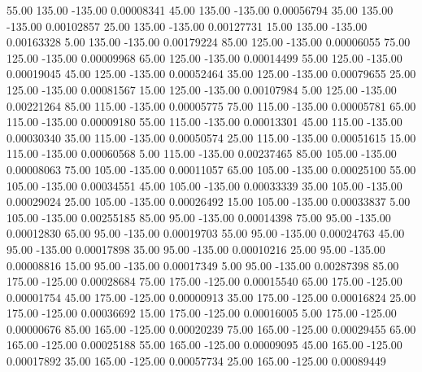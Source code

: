      55.00    135.00   -135.00     0.00008341
     45.00    135.00   -135.00     0.00056794
     35.00    135.00   -135.00     0.00102857
     25.00    135.00   -135.00     0.00127731
     15.00    135.00   -135.00     0.00163328
      5.00    135.00   -135.00     0.00179224
     85.00    125.00   -135.00     0.00006055
     75.00    125.00   -135.00     0.00009968
     65.00    125.00   -135.00     0.00014499
     55.00    125.00   -135.00     0.00019045
     45.00    125.00   -135.00     0.00052464
     35.00    125.00   -135.00     0.00079655
     25.00    125.00   -135.00     0.00081567
     15.00    125.00   -135.00     0.00107984
      5.00    125.00   -135.00     0.00221264
     85.00    115.00   -135.00     0.00005775
     75.00    115.00   -135.00     0.00005781
     65.00    115.00   -135.00     0.00009180
     55.00    115.00   -135.00     0.00013301
     45.00    115.00   -135.00     0.00030340
     35.00    115.00   -135.00     0.00050574
     25.00    115.00   -135.00     0.00051615
     15.00    115.00   -135.00     0.00060568
      5.00    115.00   -135.00     0.00237465
     85.00    105.00   -135.00     0.00008063
     75.00    105.00   -135.00     0.00011057
     65.00    105.00   -135.00     0.00025100
     55.00    105.00   -135.00     0.00034551
     45.00    105.00   -135.00     0.00033339
     35.00    105.00   -135.00     0.00029024
     25.00    105.00   -135.00     0.00026492
     15.00    105.00   -135.00     0.00033837
      5.00    105.00   -135.00     0.00255185
     85.00     95.00   -135.00     0.00014398
     75.00     95.00   -135.00     0.00012830
     65.00     95.00   -135.00     0.00019703
     55.00     95.00   -135.00     0.00024763
     45.00     95.00   -135.00     0.00017898
     35.00     95.00   -135.00     0.00010216
     25.00     95.00   -135.00     0.00008816
     15.00     95.00   -135.00     0.00017349
      5.00     95.00   -135.00     0.00287398
     85.00    175.00   -125.00     0.00028684
     75.00    175.00   -125.00     0.00015540
     65.00    175.00   -125.00     0.00001754
     45.00    175.00   -125.00     0.00000913
     35.00    175.00   -125.00     0.00016824
     25.00    175.00   -125.00     0.00036692
     15.00    175.00   -125.00     0.00016005
      5.00    175.00   -125.00     0.00000676
     85.00    165.00   -125.00     0.00020239
     75.00    165.00   -125.00     0.00029455
     65.00    165.00   -125.00     0.00025188
     55.00    165.00   -125.00     0.00009095
     45.00    165.00   -125.00     0.00017892
     35.00    165.00   -125.00     0.00057734
     25.00    165.00   -125.00     0.00089449
